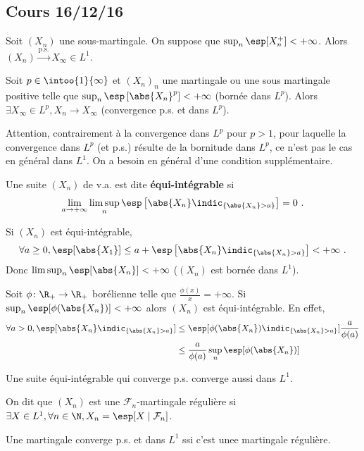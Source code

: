 \subsection{Cours 16/12/16}

	\begin{thm}
		Soit $(X_n)$ une sous-martingale.
		On suppose que $\sup_n \esp[X_n^+] < +\infty$.
		Alors $(X_n) \overset{\text{p.s.}}{\longrightarrow} X_{\infty} \in L^1$.
	\end{thm}

	\begin{thm}
		Soit $p \in \intoo{1}{\infty}$ et $(X_n)_n$ une martingale ou une sous martingale positive telle que $\sup_n \esp \left[ \abs{X_n}^p \right] < +\infty$ (bornée dans $L^p$).
		Alors $\exists X_\infty \in L^p, X_n \longrightarrow X_\infty$ (convergence p.s. et dans $L^p$).
	\end{thm}

	Attention, contrairement à la convergence dans $L^p$ pour $p > 1$, pour laquelle la convergence dans $L^p$ (et p.s.) résulte de la bornitude dans $L^p$, ce n'est pas le cas en général dans $L^1$.
	On a besoin en général d'une condition supplémentaire.
	
	\begin{defn}
		Une suite $(X_n)$ de v.a. est dite \textbf{équi-intégrable} si
		$$\lim_{a \to +\infty} \limsup_n \esp \left[ \abs{X_n} \indic_{\{ \abs{X_n} > a \} } \right] = 0\ .$$
	\end{defn}

	\begin{rem}
		Si $(X_n)$ est équi-intégrable,
		$$\forall a \geq 0, \esp[\abs{X_1}] \leq a + \esp \left[ \abs{X_n} \indic_{\{ \abs{X_n} > a \} } \right] < +\infty\ .$$
		Donc $\limsup_n \esp[\abs{X_n}] < +\infty$ ($(X_n)$ est bornée dans $L^1$).
	\end{rem}

	\begin{rem}
		Soit $\phi \colon \R_+ \to \R_+$ borélienne telle que $\frac{\phi(x)}{x} = +\infty$.
		Si $\sup_n \esp[\phi(\abs{X_n})] < +\infty$ alors $(X_n)$ est équi-intégrable.
		En effet,
		\begin{align*}
			\forall a > 0, \esp[ \abs{X_n} \indic_{\{ \abs{X_n} > a \} } ]
				& \leq \esp[ \phi(\abs{X_n}) \indic_{\{ \abs{X_n} > a \} } ] \frac{a}{\phi(a)} \\
				& \leq \frac{a}{\phi(a)} \sup_n \esp[ \phi(\abs{X_n}) ]
		\end{align*}
	\end{rem}

	\begin{pop}
		Une suite équi-intégrable qui converge p.s. converge aussi dans $L^1$.
	\end{pop}

	\begin{defn}
		On dit que $(X_n)$ est une $\mathcal{F}_n$-martingale régulière si $\exists X \in L^1, \forall n \in \N, X_n = \esp[X \mid \mathcal{F}_n]$.
	\end{defn}

	\begin{thm}
		Une martingale converge p.s. et dans $L^1$ ssi c'est unee martingale régulière.
	\end{thm}

